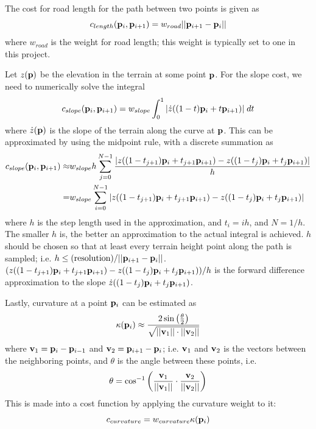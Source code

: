 The cost for road length for the path between two points is given as 
\begin{equation}
c_{length}({\mathbf p}_i, {\mathbf p}_{i+1}) = w_{road}||{\mathbf p}_{i+1} - {\mathbf p}_i||
\label{eq:cost_length}
\end{equation}
where $w_{road}$ is the weight for road length; this weight is typically set to one in this project. 

Let $z({\mathbf p})$ be the elevation in the terrain at some point ${\mathbf p}$. For the slope cost, we need to numerically solve the integral
$$
c_{slope}({\mathbf p}_i, {\mathbf p}_{i+1}) = w_{slope}\int_{0}^{1} |\dot{z}((1-t){\mathbf p}_i+t{\mathbf p}_{i+1})|\; dt
$$
where $\dot{z}({\mathbf p})$ is the slope of the terrain along the curve at ${\mathbf p}$. This can be approximated by using the midpoint rule, with a discrete summation as
\begin{align}
c_{slope}({\mathbf p}_i, {\mathbf p}_{i+1}) \approx& w_{slope}h\sum_{j=0}^{N-1} \frac{|z((1-t_{j+1}){\mathbf p}_i+t_{j+1}{\mathbf p}_{i+1})-z((1-t_j){\mathbf p}_i+t_j{\mathbf p}_{i+1})|}{h}\notag\\
                                            =& w_{slope}\sum_{i=0}^{N-1} |z((1-t_{j+1}){\mathbf p}_i+t_{j+1}{\mathbf p}_{i+1})-z((1-t_j){\mathbf p}_i+t_j{\mathbf p}_{i+1})| 
\label{eq:cost_slope}
\end{align}
where $h$ is the step length used in the approximation, and $t_i=ih$, and $N=1/h$. The smaller $h$ is, the better an approximation to the actual integral is achieved. $h$ should be chosen so that at least every terrain height point along the path is sampled; i.e. $h \leq \mbox{(resolution)}/||{\mathbf p}_{i+1}-{\mathbf p}_i||$. $(z((1-t_{j+1}){\mathbf p}_i+t_{j+1}{\mathbf p}_{i+1})-z((1-t_j){\mathbf p}_i+t_j{\mathbf p}_{i+1}))/h$ is the forward difference approximation to the slope $\dot{z}((1-t_j){\mathbf p}_i+t_j{\mathbf p}_{i+1})$.

Lastly, curvature at a point ${\mathbf p}_i$ can be estimated as\cite{clothoid3}
\begin{equation}
\kappa({\mathbf p}_i) \approx \frac{2\sin\left(\frac{\theta}{2}\right)}{\sqrt{||{\mathbf v}_1||\cdot ||{\mathbf v}_2||}}
\label{eq:curvature_approx}
\end{equation}
where ${\mathbf v}_1 = {\mathbf p}_i-{\mathbf p}_{i-1}$ and ${\mathbf v}_2 = {\mathbf p}_{i+1}-{\mathbf p}_i$; i.e. ${\mathbf v}_1$ and ${\mathbf v}_2$ is the vectors between the neighboring points, and $\theta$ is the angle between these points, i.e.
$$
\theta = \cos^{-1}\left(\frac{{\mathbf v}_1}{||{\mathbf v}_1||} \cdot \frac{{\mathbf v}_2}{||{\mathbf v}_2||} \right)
$$
This is made into a cost function by applying the curvature weight to it:
\begin{equation}
c_{curvature} = w_{curvature}\kappa({\mathbf p}_i)
\label{eq:cost_curvature}
\end{equation}

